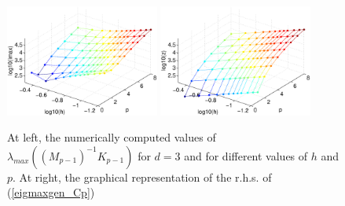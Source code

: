 \documentclass[11pt]{article}
\begin{document}
\begin{figure}
\begin{center}
\includegraphics[width=0.45\textwidth]{Images/igap_eiggen3max.eps}\quad
\includegraphics[width=0.45\textwidth]{Images/igap_eiggen3smax.eps}
\end{center}
\caption{At left, the numerically computed values of
$\lambda_{max}((M_{p-1})^{-1}K_{p-1})$ for $d=3$ and
for different values of $h$ and $p$. At right,
the graphical representation of the r.h.s. of (\ref{eigmaxgen_Cp})}
\label{fig:genmax-igapd3}
\end{figure}






\end{document}
